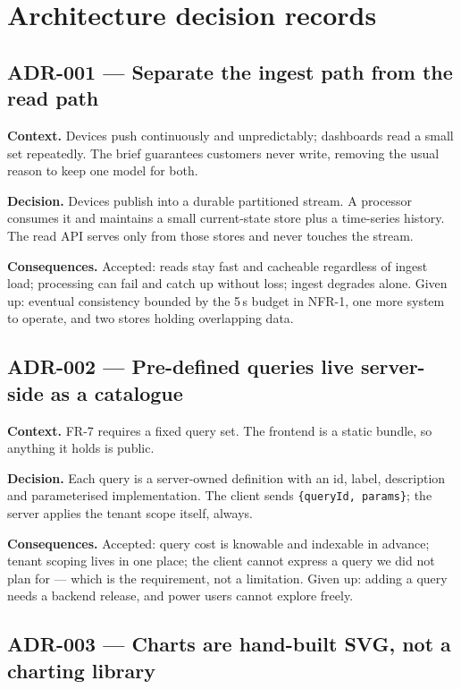 \documentclass[11pt,a4paper]{article}
\begin{document}
\section{Architecture decision records}

\subsection*{ADR-001 --- Separate the ingest path from the read path}

\textbf{Context.} Devices push continuously and unpredictably; dashboards read a
small set repeatedly. The brief guarantees customers never write, removing the usual
reason to keep one model for both.

\textbf{Decision.} Devices publish into a durable partitioned stream. A processor
consumes it and maintains a small current-state store plus a time-series history. The
read API serves only from those stores and never touches the stream.

\textbf{Consequences.} Accepted: reads stay fast and cacheable regardless of ingest
load; processing can fail and catch up without loss; ingest degrades alone. Given up:
eventual consistency bounded by the 5\,s budget in NFR-1, one more system to operate,
and two stores holding overlapping data.

\subsection*{ADR-002 --- Pre-defined queries live server-side as a catalogue}

\textbf{Context.} FR-7 requires a fixed query set. The frontend is a static bundle, so
anything it holds is public.

\textbf{Decision.} Each query is a server-owned definition with an id, label,
description and parameterised implementation. The client sends
\texttt{\{queryId, params\}}; the server applies the tenant scope itself, always.

\textbf{Consequences.} Accepted: query cost is knowable and indexable in advance;
tenant scoping lives in one place; the client cannot express a query we did not plan
for --- which is the requirement, not a limitation. Given up: adding a query needs a
backend release, and power users cannot explore freely.

\subsection*{ADR-003 --- Charts are hand-built SVG, not a charting library}
\end{document}
